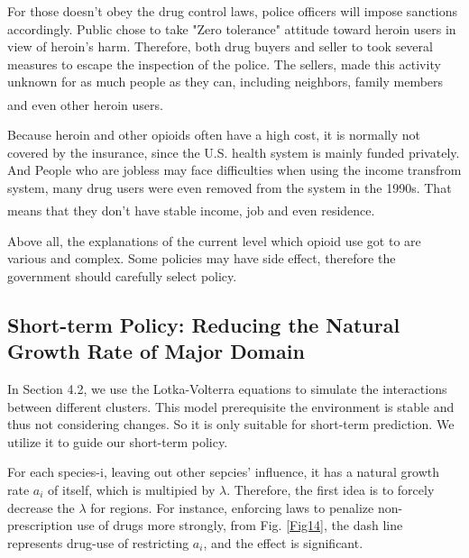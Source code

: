 \documentclass[12pt]{article}
\newcommand{\upcite}[1]{\textsuperscript{\textsuperscript{\cite{#1}}}}
\begin{document}
For those doesn't obey the drug control laws, police officers will impose sanctions accordingly. Public chose to take "Zero tolerance" attitude toward heroin users in view of heroin's harm. Therefore, both drug buyers and seller to took several measures to escape the inspection of the police. The sellers, made this activity unknown for as much people as they can, including neighbors, family members and even other heroin users\upcite{5}.

Because heroin and other opioids often have a high cost, it is normally not covered by the insurance, since the U.S. health system is mainly funded privately. And People who are jobless may face difficulties when using the income transfrom system, many drug users were even removed from the system in the 1990s. That means that they don't have stable income, job and even residence\upcite{5}.

Above all, the explanations of the current level which opioid use got to are various and complex. Some policies may have side effect, therefore the government should carefully select policy.

\subsection{Short-term Policy: Reducing the Natural Growth Rate of Major Domain}
In Section 4.2, we use the Lotka-Volterra equations to simulate the interactions between different clusters. This model prerequisite the environment is stable and thus not considering changes. So it is only suitable for short-term prediction. We utilize it to guide our short-term policy.

For each species-i, leaving out other sepcies' influence, it has a natural growth rate $a_{i}$ of itself, which is multipied by $\lambda$. Therefore, the first idea is to forcely decrease the $\lambda$ for regions. For instance, enforcing laws to penalize non-prescription use of drugs more strongly, from Fig. \ref{Fig14}, the dash line represents drug-use of restricting $a_{i}$, and the effect is significant.
\end{document}
